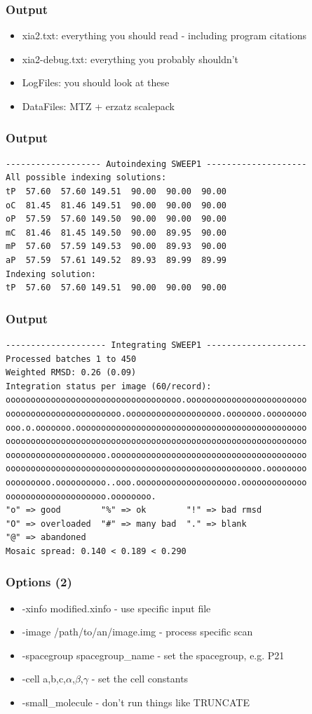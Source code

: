 \documentclass[slides,compress]{beamer}
\begin{document}
\begin{frame}
\frametitle{Output}
\begin{itemize}
\item{xia2.txt: everything you should read - including program citations}
\item{xia2-debug.txt: everything you probably shouldn't}
\item{LogFiles: you should look at these}
\item{DataFiles: MTZ + erzatz scalepack}
\end{itemize}
\end{frame}

\begin{frame}[fragile]
\frametitle{Output}
{\small
\begin{verbatim}
------------------- Autoindexing SWEEP1 --------------------
All possible indexing solutions:
tP  57.60  57.60 149.51  90.00  90.00  90.00
oC  81.45  81.46 149.51  90.00  90.00  90.00
oP  57.59  57.60 149.50  90.00  90.00  90.00
mC  81.46  81.45 149.50  90.00  89.95  90.00
mP  57.60  57.59 149.53  90.00  89.93  90.00
aP  57.59  57.61 149.52  89.93  89.99  89.99
Indexing solution:
tP  57.60  57.60 149.51  90.00  90.00  90.00
\end{verbatim}
}
\end{frame}

\begin{frame}[fragile]
\frametitle{Output}
{\small
\begin{verbatim}
-------------------- Integrating SWEEP1 --------------------
Processed batches 1 to 450
Weighted RMSD: 0.26 (0.09)
Integration status per image (60/record):
ooooooooooooooooooooooooooooooooooo.oooooooooooooooooooooooo
ooooooooooooooooooooooo.ooooooooooooooooooo.ooooooo.oooooooo
ooo.o.ooooooo.oooooooooooooooooooooooooooooooooooooooooooooo
oooooooooooooooooooooooooooooooooooooooooooooooooooooooooooo
oooooooooooooooooooo.ooooooooooooooooooooooooooooooooooooooo
ooooooooooooooooooooooooooooooooooooooooooooooooooo.oooooooo
ooooooooo.oooooooooo..ooo.oooooooooooooooooooo.ooooooooooooo
oooooooooooooooooooo.oooooooo.
"o" => good        "%" => ok        "!" => bad rmsd
"O" => overloaded  "#" => many bad  "." => blank
"@" => abandoned
Mosaic spread: 0.140 < 0.189 < 0.290
\end{verbatim}
}
\end{frame}

\begin{frame}
\frametitle{Options (2)}
\begin{itemize}
\item{-xinfo modified.xinfo - use specific input file}
\item{-image /path/to/an/image.img - process specific scan}
\item{-spacegroup spacegroup\_name - set the spacegroup, e.g. P21}
\item{-cell a,b,c,$\alpha$,$\beta$,$\gamma$ - set the cell constants} 
\item{-small\_molecule - don't run things like TRUNCATE}
\end{itemize}
\end{frame}
\end{document}
